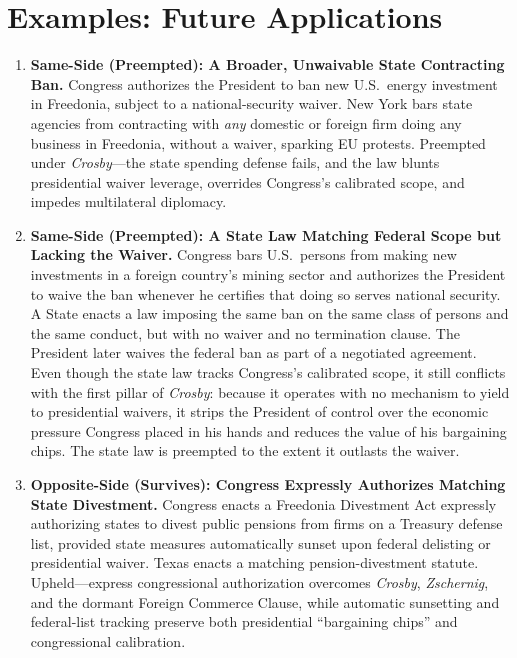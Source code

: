 \documentclass[12pt]{article}
\begin{document}
\section{Examples: Future Applications}
\begin{enumerate}

\item \textbf{Same-Side (Preempted): A Broader, Unwaivable State Contracting Ban.} Congress authorizes the President to ban new U.S.\ energy investment in Freedonia, subject to a national-security waiver. New York bars state agencies from contracting with \textit{any} domestic or foreign firm doing any business in Freedonia, without a waiver, sparking EU protests. Preempted under \textit{Crosby}---the state spending defense fails, and the law blunts presidential waiver leverage, overrides Congress's calibrated scope, and impedes multilateral diplomacy.

\item \textbf{Same-Side (Preempted): A State Law Matching Federal Scope but Lacking the Waiver.} Congress bars U.S.\ persons from making new investments in a foreign country's mining sector and authorizes the President to waive the ban whenever he certifies that doing so serves national security. A State enacts a law imposing the same ban on the same class of persons and the same conduct, but with no waiver and no termination clause. The President later waives the federal ban as part of a negotiated agreement. Even though the state law tracks Congress's calibrated scope, it still conflicts with the first pillar of \textit{Crosby}: because it operates with no mechanism to yield to presidential waivers, it strips the President of control over the economic pressure Congress placed in his hands and reduces the value of his bargaining chips. The state law is preempted to the extent it outlasts the waiver.

\item \textbf{Opposite-Side (Survives): Congress Expressly Authorizes Matching State Divestment.} Congress enacts a Freedonia Divestment Act expressly authorizing states to divest public pensions from firms on a Treasury defense list, provided state measures automatically sunset upon federal delisting or presidential waiver. Texas enacts a matching pension-divestment statute. Upheld---express congressional authorization overcomes \textit{Crosby}, \textit{Zschernig}, and the dormant Foreign Commerce Clause, while automatic sunsetting and federal-list tracking preserve both presidential ``bargaining chips'' and congressional calibration.


\end{enumerate}
\end{document}
